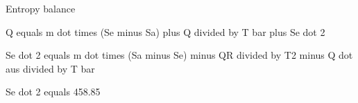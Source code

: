 Entropy balance

Q equals m dot times (Se minus Sa) plus Q divided by T bar plus Se dot 2

Se dot 2 equals m dot times (Sa minus Se) minus QR divided by T2 minus Q dot aus divided by T bar

Se dot 2 equals 458.85